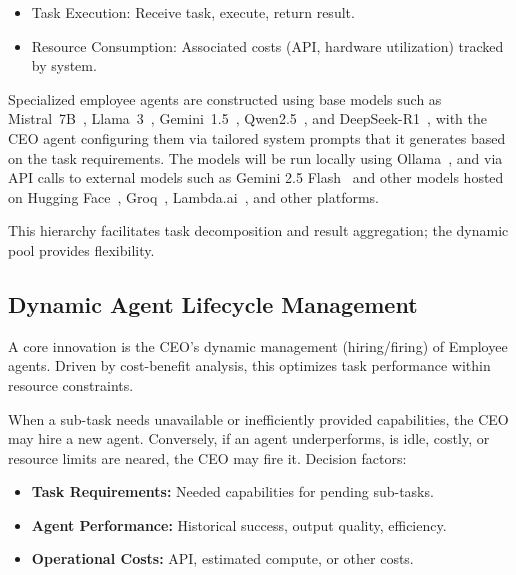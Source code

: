 \documentclass[conference]{IEEEtran}
\begin{document}
\begin{itemize}
\begin{itemize}
            \item Task Execution: Receive task, execute, return result.
            \item Resource Consumption: Associated costs (API, hardware utilization) tracked by system.
        \end{itemize}
        Specialized employee agents are constructed using base models such as Mistral~7B~\cite{jiang2023mistral}, Llama~3~\cite{llama3herd}, Gemini~1.5~\cite{gemini1.5_report}, Qwen2.5~\cite{qwen2.5_report}, and DeepSeek-R1~\cite{deepseekr1_report}, with the CEO agent configuring them via tailored system prompts that it generates based on the task requirements.
        The models will be run locally using Ollama~\cite{ollama}, and via API calls to external models such as Gemini 2.5 Flash~\cite{gemini25flash} and other models hosted on Hugging Face~\cite{huggingface2025}, Groq~\cite{groq2025}, Lambda.ai~\cite{lambda2025}, and other platforms.
\end{itemize}
This hierarchy facilitates task decomposition and result aggregation; the dynamic pool provides flexibility.

\subsection{Dynamic Agent Lifecycle Management}
\label{subsec:dynamic_mgmt}
A core innovation is the CEO's dynamic management (hiring/firing) of Employee agents. Driven by cost-benefit analysis, this optimizes task performance within resource constraints.

When a sub-task needs unavailable or inefficiently provided capabilities, the CEO may hire a new agent. Conversely, if an agent underperforms, is idle, costly, or resource limits are neared, the CEO may fire it. Decision factors:
\begin{itemize}
    \item \textbf{Task Requirements:} Needed capabilities for pending sub-tasks.
    \item \textbf{Agent Performance:} Historical success, output quality, efficiency.
    \item \textbf{Operational Costs:} API, estimated compute, or other costs.
\end{itemize}
\end{document}
